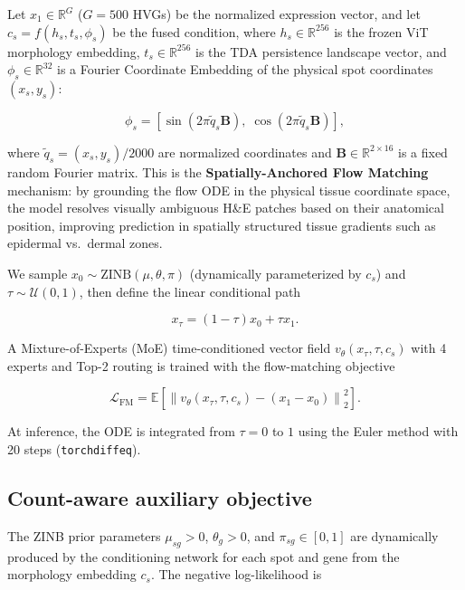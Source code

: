 \documentclass[nocrop]{bioinfo}
\begin{document}
Let $x_1\in\mathbb{R}^{G}$ ($G = 500$ HVGs) be the normalized expression vector,
and let $c_s = f(h_s, t_s, \phi_s)$ be the fused condition, where $h_s \in \mathbb{R}^{256}$
is the frozen ViT morphology embedding, $t_s \in \mathbb{R}^{256}$ is the TDA persistence
landscape vector, and $\phi_s \in \mathbb{R}^{32}$ is a Fourier Coordinate Embedding of the
physical spot coordinates $(x_s, y_s)$:

\begin{equation}
\phi_s = \left[\sin(2\pi \tilde{q}_s \mathbf{B}),\; \cos(2\pi \tilde{q}_s \mathbf{B})\right],
\end{equation}

where $\tilde{q}_s = (x_s, y_s) / 2000$ are normalized coordinates and $\mathbf{B} \in \mathbb{R}^{2 \times 16}$
is a fixed random Fourier matrix. This is the \textbf{Spatially-Anchored Flow Matching} mechanism:
by grounding the flow ODE in the physical tissue coordinate space, the model resolves
visually ambiguous H\&E patches based on their anatomical position, improving prediction
in spatially structured tissue gradients such as epidermal vs.\ dermal zones.

We sample $x_0 \sim \text{ZINB}(\mu, \theta, \pi)$ (dynamically parameterized by $c_s$)
and $\tau\sim\mathcal{U}(0,1)$, then define the linear conditional path

\begin{equation}
x_{\tau}=(1-\tau)x_0+\tau x_1.
\end{equation}

A Mixture-of-Experts (MoE) time-conditioned vector field
$v_{\theta}(x_{\tau},\tau,c_s)$ with 4 experts and Top-2 routing is trained with the flow-matching objective

\begin{equation}
\mathcal{L}_{\mathrm{FM}}=
\mathbb{E}\left[
\left\|
v_{\theta}(x_{\tau},\tau,c_s)-(x_1-x_0)
\right\|_2^2
\right].
\end{equation}

At inference, the ODE is integrated from $\tau=0$ to $1$ using the Euler method with 20 steps (\texttt{torchdiffeq}).

\subsection{Count-aware auxiliary objective}

The ZINB prior parameters $\mu_{sg}>0$, $\theta_g>0$, and
$\pi_{sg}\in[0,1]$ are dynamically produced by the conditioning network for each
spot and gene from the morphology embedding $c_s$. The negative log-likelihood is
\end{document}

